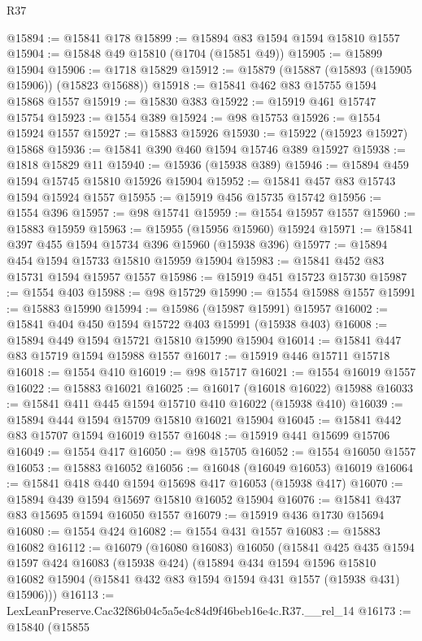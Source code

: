\begin{lexlean}{R37}
\begin{coremodule}
@15894 := @15841 @178
@15899 := @15894 @83 @1594 @1594 @15810 @1557
@15904 := @15848 @49 @15810 (@1704 (@15851 @49))
@15905 := @15899 @15904
@15906 := @1718 @15829
@15912 := @15879 (@15887 (@15893 (@15905 @15906)) (@15823 @15688))
@15918 := @15841 @462 @83 @15755 @1594 @15868 @1557
@15919 := @15830 @383
@15922 := @15919 @461 @15747 @15754
@15923 := @1554 @389
@15924 := @98 @15753
@15926 := @1554 @15924 @1557
@15927 := @15883 @15926
@15930 := @15922 (@15923 @15927) @15868
@15936 := @15841 @390 @460 @1594 @15746 @389 @15927
@15938 := @1818 @15829 @11
@15940 := @15936 (@15938 @389)
@15946 := @15894 @459 @1594 @15745 @15810 @15926 @15904
@15952 := @15841 @457 @83 @15743 @1594 @15924 @1557
@15955 := @15919 @456 @15735 @15742
@15956 := @1554 @396
@15957 := @98 @15741
@15959 := @1554 @15957 @1557
@15960 := @15883 @15959
@15963 := @15955 (@15956 @15960) @15924
@15971 := @15841 @397 @455 @1594 @15734 @396 @15960 (@15938 @396)
@15977 := @15894 @454 @1594 @15733 @15810 @15959 @15904
@15983 := @15841 @452 @83 @15731 @1594 @15957 @1557
@15986 := @15919 @451 @15723 @15730
@15987 := @1554 @403
@15988 := @98 @15729
@15990 := @1554 @15988 @1557
@15991 := @15883 @15990
@15994 := @15986 (@15987 @15991) @15957
@16002 := @15841 @404 @450 @1594 @15722 @403 @15991 (@15938 @403)
@16008 := @15894 @449 @1594 @15721 @15810 @15990 @15904
@16014 := @15841 @447 @83 @15719 @1594 @15988 @1557
@16017 := @15919 @446 @15711 @15718
@16018 := @1554 @410
@16019 := @98 @15717
@16021 := @1554 @16019 @1557
@16022 := @15883 @16021
@16025 := @16017 (@16018 @16022) @15988
@16033 := @15841 @411 @445 @1594 @15710 @410 @16022 (@15938 @410)
@16039 := @15894 @444 @1594 @15709 @15810 @16021 @15904
@16045 := @15841 @442 @83 @15707 @1594 @16019 @1557
@16048 := @15919 @441 @15699 @15706
@16049 := @1554 @417
@16050 := @98 @15705
@16052 := @1554 @16050 @1557
@16053 := @15883 @16052
@16056 := @16048 (@16049 @16053) @16019
@16064 := @15841 @418 @440 @1594 @15698 @417 @16053 (@15938 @417)
@16070 := @15894 @439 @1594 @15697 @15810 @16052 @15904
@16076 := @15841 @437 @83 @15695 @1594 @16050 @1557
@16079 := @15919 @436 @1730 @15694
@16080 := @1554 @424
@16082 := @1554 @431 @1557
@16083 := @15883 @16082
@16112 := @16079
    (@16080 @16083)
    @16050
    (@15841
      @425
      @435
      @1594
      @1597
      @424
      @16083
      (@15938 @424)
      (@15894
        @434
        @1594
        @1596
        @15810
        @16082
        @15904
        (@15841 @432 @83 @1594 @1594 @431 @1557 (@15938 @431) @15906)))
@16113 := LexLeanPreserve.Cac32f86b04c5a5e4c84d9f46beb16e4c.R37.__rel_14
@16173 := @15840
    (@15855

\end{coremodule}
\end{lexlean}
